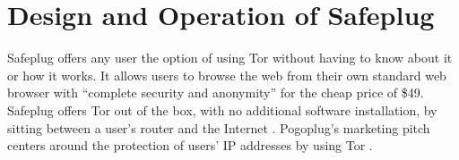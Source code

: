 \documentclass[letterpaper,twocolumn,10pt]{article}
\begin{document}




\section{Design and Operation of Safeplug}
Safeplug \cite{safeplug} offers any user the option of using Tor \cite{torproject} without having to know about it or how it works.  It allows users to browse the web from their own standard web browser with “complete security and anonymity” for the cheap price of \$49.  Safeplug offers Tor out of the box, with no additional software installation, by sitting between a user's router and the Internet \cite{wired}.  Pogoplug's marketing pitch centers around the protection of users' IP addresses by using Tor \cite{bittech}.
\end{document}
